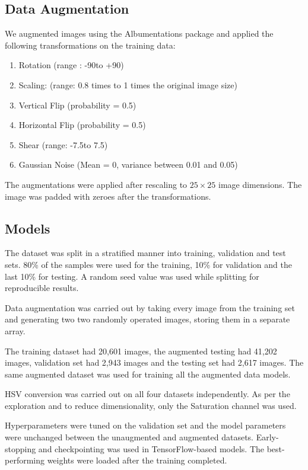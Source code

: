 \documentclass[10pt,twocolumn,letterpaper]{article}
\begin{document}
\subsection{Data Augmentation}

We augmented images using the Albumentations package \cite{info11020125} and applied the following transformations on the training data:
\begin{enumerate}
   \item Rotation (range : -90\textdegree to +90\textdegree)
   \item Scaling: (range: 0.8 times to 1 times the original image size)
   \item Vertical Flip (probability = 0.5)
   \item Horizontal Flip (probability = 0.5)
   \item Shear (range: -7.5\textdegree to 7.5\textdegree)
   \item Gaussian Noise (Mean = 0, variance between 0.01 and 0.05)
\end{enumerate}

The augmentations were applied after rescaling to $25 \times 25$ image dimensions. The image was padded with zeroes after the transformations.

\subsection{Models}
The dataset was split in a stratified manner into training, validation and test sets. 80\% of the samples were used for the training, 10\% for validation and the last 10\% for testing. A random seed value was used while splitting for reproducible results.

Data augmentation was carried out by taking every image from the training set and generating two two randomly operated images, storing them in a separate array. 

The training dataset had 20,601 images, the augmented testing had 41,202 images, validation set had 2,943 images and the testing set had 2,617 images. The same augmented dataset was used for training all the augmented data models.

HSV conversion was carried out on all four datasets independently. As per the exploration and to reduce dimensionality, only the Saturation channel was used.

Hyperparameters were tuned on the validation set and the model parameters were unchanged between the unaugmented and augmented datasets. Early-stopping and checkpointing was used in TensorFlow-based models. The best-performing weights were loaded after the training completed.
\end{document}
